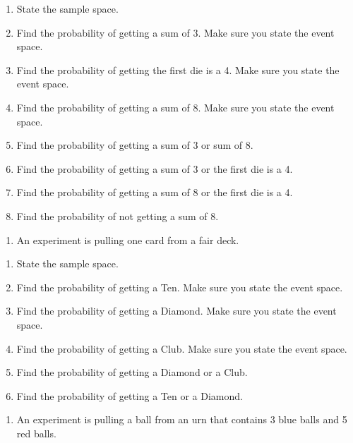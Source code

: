 \documentclass[
]{book}
\providecommand{\tightlist}{%
  \setlength{\itemsep}{0pt}\setlength{\parskip}{0pt}}
\begin{document}
\begin{enumerate}
\def\labelenumi{\alph{enumi}.}
\tightlist
\item
  State the sample space.
\item
  Find the probability of getting a sum of 3. Make sure you state the event space.
\item
  Find the probability of getting the first die is a 4. Make sure you state the event space.
\item
  Find the probability of getting a sum of 8. Make sure you state the event space.
\item
  Find the probability of getting a sum of 3 or sum of 8.
\item
  Find the probability of getting a sum of 3 or the first die is a 4.
\item
  Find the probability of getting a sum of 8 or the first die is a 4.
\item
  Find the probability of not getting a sum of 8.
\end{enumerate}

\begin{enumerate}
\def\labelenumi{\arabic{enumi}.}
\setcounter{enumi}{5}
\tightlist
\item
  An experiment is pulling one card from a fair deck.
\end{enumerate}

\begin{enumerate}
\def\labelenumi{\alph{enumi}.}
\tightlist
\item
  State the sample space.
\item
  Find the probability of getting a Ten. Make sure you state the event space.
\item
  Find the probability of getting a Diamond. Make sure you state the event space.
\item
  Find the probability of getting a Club. Make sure you state the event space.
\item
  Find the probability of getting a Diamond or a Club.
\item
  Find the probability of getting a Ten or a Diamond.
\end{enumerate}

\begin{enumerate}
\def\labelenumi{\arabic{enumi}.}
\setcounter{enumi}{6}
\tightlist
\item
  An experiment is pulling a ball from an urn that contains 3 blue balls and 5 red balls.
\end{enumerate}
\end{document}
